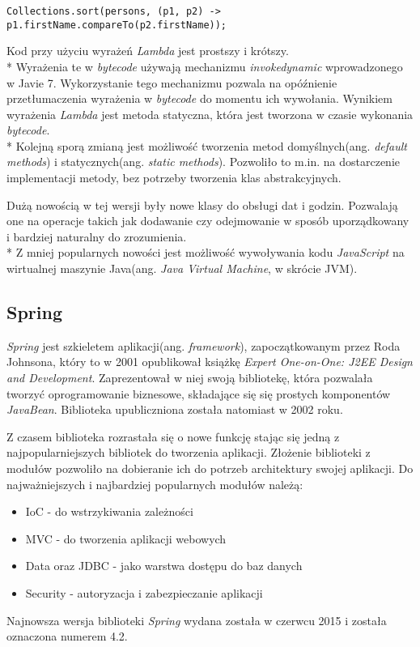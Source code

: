 \begin{lstlisting}[caption=Sortowanie kolekcji w języku Java przy użyciu wyrażeń \textsl{Lambda},label={lst:javalambda}, aboveskip=0mm]
Collections.sort(persons, (p1, p2) -> p1.firstName.compareTo(p2.firstName));
\end{lstlisting}
Kod przy użyciu wyrażeń \textsl{Lambda} jest prostszy i krótszy.\\*
Wyrażenia te w \textsl{bytecode} używają mechanizmu \textsl{invokedynamic} wprowadzonego w Javie 7. Wykorzystanie tego mechanizmu pozwala na opóźnienie przetłumaczenia wyrażenia w \textsl{bytecode} do momentu ich wywołania. Wynikiem wyrażenia \textsl{Lambda} jest metoda statyczna, która jest tworzona w czasie wykonania \textsl{bytecode}.\\*
Kolejną sporą zmianą jest możliwość tworzenia metod domyślnych(ang. \textsl{default methods}) i statycznych(ang. \textsl{static methods}). Pozwoliło to m.in. na dostarczenie implementacji metody, bez potrzeby tworzenia klas abstrakcyjnych.

Dużą nowością w tej wersji były nowe klasy do obsługi dat i godzin. Pozwalają one na operacje takich jak dodawanie czy odejmowanie w sposób uporządkowany i bardziej naturalny do zrozumienia.\\*
Z mniej popularnych nowości jest możliwość wywoływania kodu \textsl{JavaScript} na wirtualnej maszynie Java(ang. \textsl{Java Virtual Machine}, w skrócie JVM).


\subsection{Spring}
\textsl{Spring} jest szkieletem aplikacji(ang. \textsl{framework}), zapoczątkowanym przez Roda Johnsona, który to w 2001 opublikował książkę \textsl{Expert One-on-One: J2EE Design and Development}\cite{jeedesign}. Zaprezentował w niej swoją bibliotekę, która pozwalała tworzyć oprogramowanie biznesowe, składające się się prostych komponentów \textsl{JavaBean}. Biblioteka upubliczniona została natomiast w 2002 roku\cite{springinaction}.

Z czasem biblioteka rozrastała się o nowe funkcję stając się jedną z najpopularniejszych bibliotek do tworzenia aplikacji. Złożenie biblioteki z modułów pozwoliło na dobieranie ich do potrzeb architektury swojej aplikacji. Do najważniejszych i najbardziej popularnych modułów należą:
\begin{itemize}
\item IoC - do wstrzykiwania zależności
\item MVC - do tworzenia aplikacji webowych
\item Data oraz JDBC - jako warstwa dostępu do baz danych
\item Security - autoryzacja i zabezpieczanie aplikacji
\end{itemize}
Najnowsza wersja biblioteki \textsl{Spring} wydana została w czerwcu 2015 i została oznaczona numerem 4.2.


